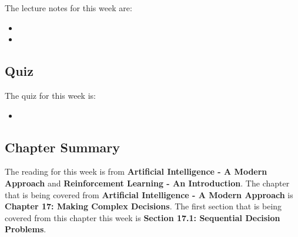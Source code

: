 \noindent The lecture notes for this week are:

\begin{itemize}
    \item {}
    \item {}
\end{itemize}

\subsection{Quiz}

The quiz for this week is:

\begin{itemize}
    \item {}
\end{itemize}

\subsection{Chapter Summary}

The reading for this week is from \textbf{Artificial Intelligence - A Modern Approach} and \textbf{Reinforcement Learning - An Introduction}. The chapter that is being covered from \textbf{Artificial Intelligence - A Modern Approach}
is \textbf{Chapter 17: Making Complex Decisions}. The first section that is being covered from this chapter this week is \textbf{Section 17.1: Sequential Decision Problems}.

